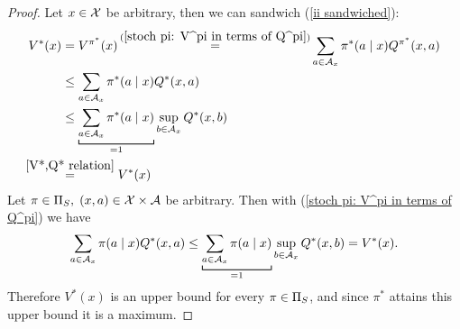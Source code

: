 \begin{proof}
	\xToy{\ref{ii:1}}{\ref{ii:2}} Let \(x\in\mathcal{X}\) be arbitrary, then we can sandwich (\ref{ii sandwiched}):
	\begin{align}
		V^*(x)&=V^{\pi^*}(x)\xeq{(\ref{stoch pi: V^pi in terms of Q^pi})}
		\sum_{a\in\cA_x}\pi^*(a\mid x) Q^{\pi^*}(x,a) \nonumber\\
		&\le \sum_{a\in\cA_x}\pi^*(a\mid x) Q^*(x,a)\label{ii sandwiched} \\
		&\le \underbracket[0.7pt]{\sum_{a\in\cA_x}\pi^*(a\mid x)}_{=1} 
		\sup_{b\in\cA_x}Q^*(x,b) \nonumber\\
		&\lxeq{\ref{V*,Q* relation}}V^*(x) \nonumber
	\end{align}
	\xToy{\ref{ii:2}}{\ref{ii:3}} Let \(\pi\in\Pi_S,\; (x,a)\in\mathcal{X}\times\mathcal{A}\) be arbitrary. Then with (\ref{stoch pi: V^pi in terms of Q^pi}) we have
	\[
		\sum_{a\in\cA_x}\pi(a\mid x) Q^*(x,a)
		\le \underbracket[0.7pt]{\sum_{a\in\cA_x}\pi(a\mid x)}_{=1}
		\sup_{b\in\cA_x}Q^*(x,b)=V^*(x).
	\]
	Therefore \(V^* (x)\) is an upper bound for every \(\pi\in\Pi_S\), and since \(\pi^*\) attains this upper bound it is a maximum.


\end{proof}
